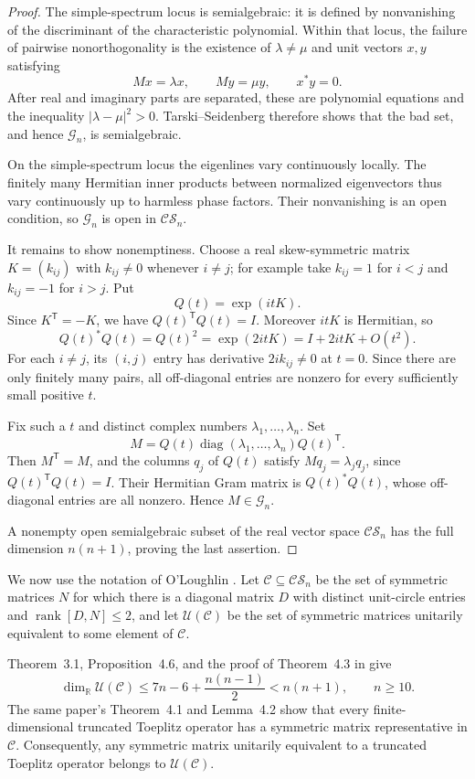 \documentclass[11pt]{article}
\newcommand{\CS}{\mathcal{CS}}
\newcommand{\Ucal}{\mathcal{U}}
\newcommand{\Ccal}{\mathcal{C}}
\newcommand{\T}{^{\mathsf T}}
\begin{document}
\begin{proof}
The simple-spectrum locus is semialgebraic: it is defined by nonvanishing of
the discriminant of the characteristic polynomial.  Within that locus, the
failure of pairwise nonorthogonality is the existence of
$\lambda\ne\mu$ and unit vectors $x,y$ satisfying
\[
Mx=\lambda x,\qquad My=\mu y,\qquad x^*y=0.
\]
After real and imaginary parts are separated, these are polynomial equations
and the inequality $|\lambda-\mu|^2>0$.  Tarski--Seidenberg therefore shows
that the bad set, and hence $\mathcal G_n$, is semialgebraic.

On the simple-spectrum locus the eigenlines vary continuously locally.  The
finitely many Hermitian inner products between normalized eigenvectors thus
vary continuously up to harmless phase factors.  Their nonvanishing is an
open condition, so $\mathcal G_n$ is open in $\CS_n$.

It remains to show nonemptiness.  Choose a real skew-symmetric matrix
$K=(k_{ij})$ with $k_{ij}\ne0$ whenever $i\ne j$; for example take
$k_{ij}=1$ for $i<j$ and $k_{ij}=-1$ for $i>j$.  Put
\[
Q(t)=\exp(itK).
\]
Since $K\T=-K$, we have $Q(t)\T Q(t)=I$.  Moreover $itK$ is Hermitian,
so
\[
Q(t)^*Q(t)=Q(t)^2=\exp(2itK)=I+2itK+O(t^2).
\]
For each $i\ne j$, its $(i,j)$ entry has derivative $2ik_{ij}\ne0$ at
$t=0$.  Since there are only finitely many pairs, all off-diagonal entries
are nonzero for every sufficiently small positive $t$.

Fix such a $t$ and distinct complex numbers $\lambda_1,\ldots,\lambda_n$.
Set
\[
M=Q(t)\operatorname{diag}(\lambda_1,\ldots,\lambda_n)Q(t)\T.
\]
Then $M\T=M$, and the columns $q_j$ of $Q(t)$ satisfy
$Mq_j=\lambda_jq_j$, since $Q(t)\T Q(t)=I$.  Their Hermitian Gram matrix
is $Q(t)^*Q(t)$, whose off-diagonal entries are all nonzero.  Hence
$M\in\mathcal G_n$.

A nonempty open semialgebraic subset of the real vector space $\CS_n$ has
the full dimension $n(n+1)$, proving the last assertion.
\end{proof}

We now use the notation of O'Loughlin \cite[Section~4]{OL}.  Let
$\Ccal\subseteq\CS_n$ be the set of symmetric matrices $N$ for which there
is a diagonal matrix $D$ with distinct unit-circle entries and
$\operatorname{rank}[D,N]\leq2$, and let $\Ucal(\Ccal)$ be the set of
symmetric matrices unitarily equivalent to some element of $\Ccal$.

Theorem~3.1, Proposition~4.6, and the proof of Theorem~4.3 in \cite{OL}
give
\begin{equation}\label{eq:bound}
\dim_{\mathbb R}\Ucal(\Ccal)
\leq 7n-6+\frac{n(n-1)}2
<n(n+1),\qquad n\geq10.
\end{equation}
The same paper's Theorem~4.1 and Lemma~4.2 show that every finite-dimensional
truncated Toeplitz operator has a symmetric matrix representative in
$\Ccal$.  Consequently, any symmetric matrix unitarily equivalent to a
truncated Toeplitz operator belongs to $\Ucal(\Ccal)$.
\end{document}
